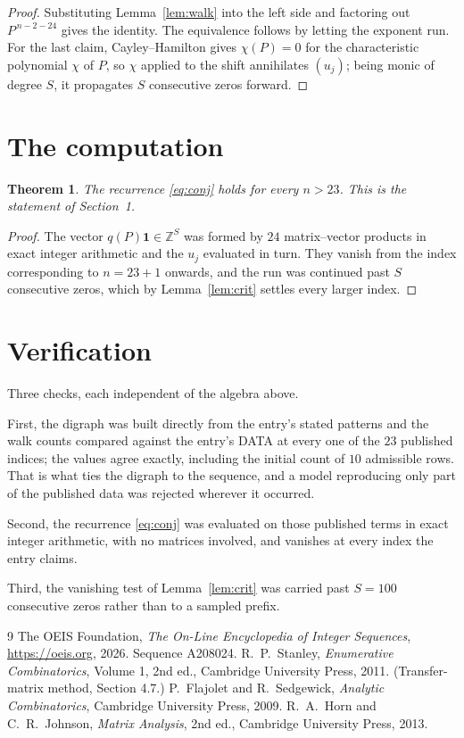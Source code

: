 \documentclass[11pt,a4paper]{article}
\theoremstyle{plain}
\newtheorem{theorem}{Theorem}
\theoremstyle{definition}
\begin{document}
\begin{proof}
Substituting Lemma~\ref{lem:walk} into the left side and factoring out
$P^{\,n-2-24}$ gives the identity. The equivalence follows by letting the exponent
run. For the last claim, Cayley--Hamilton gives $\chi(P)=0$ for the characteristic
polynomial $\chi$ of $P$, so $\chi$ applied to the shift annihilates $(u_j)$; being monic of
degree $S$, it propagates $S$ consecutive zeros forward.
\end{proof}

\section{The computation}

\begin{theorem}
The recurrence \eqref{eq:conj} holds for every $n>23$. This is the statement of
Section~1.
\end{theorem}

\begin{proof}
The vector $q(P)\mathbf{1}\in\mathbb{Z}^{S}$ was formed by $24$ matrix--vector
products in exact integer arithmetic and the $u_j$ evaluated in turn. They vanish from the
index corresponding to $n=23+1$ onwards, and the run was continued past $S$ consecutive
zeros, which by Lemma~\ref{lem:crit} settles every larger index.
\end{proof}

\section{Verification}

Three checks, each independent of the algebra above.

First, the digraph was built directly from the entry's stated patterns and the walk counts
compared against the entry's DATA at every one of the $23$ published indices; the
values agree exactly, including the initial count of $10$ admissible rows. That is
what ties the digraph to the sequence, and a model reproducing only part of the published
data was rejected wherever it occurred.

Second, the recurrence \eqref{eq:conj} was evaluated on those published terms in exact
integer arithmetic, with no matrices involved, and vanishes at every index the entry claims.

Third, the vanishing test of Lemma~\ref{lem:crit} was carried past $S=100$ consecutive
zeros rather than to a sampled prefix.

\begin{thebibliography}{9}
 The OEIS Foundation, \emph{The On-Line Encyclopedia of Integer
Sequences}, \url{https://oeis.org}, 2026. Sequence A208024.
 R.~P.~Stanley, \emph{Enumerative Combinatorics}, Volume 1, 2nd ed.,
Cambridge University Press, 2011. (Transfer-matrix method, Section 4.7.)
 P.~Flajolet and R.~Sedgewick, \emph{Analytic Combinatorics}, Cambridge
University Press, 2009.
 R.~A.~Horn and C.~R.~Johnson, \emph{Matrix Analysis}, 2nd ed., Cambridge
University Press, 2013.
\end{thebibliography}
\end{document}
